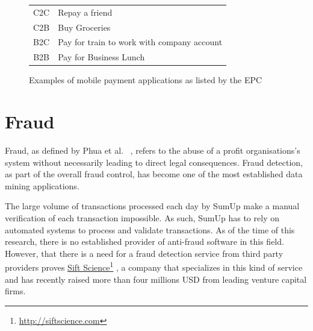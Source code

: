 \documentclass[a4paper, oneside]{csthesis}
\newcommand\fnurl[2]{%
  \href{#2}{#1}\footnote{\url{#2}}%
}
\begin{document}
\begin{figure}
        \centering
        \begin{tabular}{c|l}
        \hline
C2C & Repay a friend \\ \hdashline[0.5pt/3pt]
C2B & Buy Groceries \\ \hdashline[0.5pt/3pt]
B2C & Pay for train to work with company account \\ \hdashline[0.5pt/3pt]
B2B & Pay for Business Lunch \\ \hline
        \end{tabular}
        \caption{Examples of mobile payment applications as listed by the EPC}\label{fig:mp-applications}
\end{figure}




\section{Fraud}

Fraud, as defined by Phua et al. ~\cite{5522816}, refers to the abuse of a profit organisations's system without necessarily leading to direct legal consequences. Fraud detection, as part of the overall fraud control, has become one of the most established data mining applications.

The large volume of transactions processed each day by SumUp make a manual verification of each transaction impossible. As such, SumUp has to rely on automated systems to process and validate transactions. As of the time of this research, there is no established provider of anti-fraud software in this field. However, that there is a need for a fraud detection service from third party providers proves \fnurl{Sift Science}{http://siftscience.com}, a company that specializes in this kind of service and has recently raised more than four millions USD from leading venture capital firms.
\end{document}

